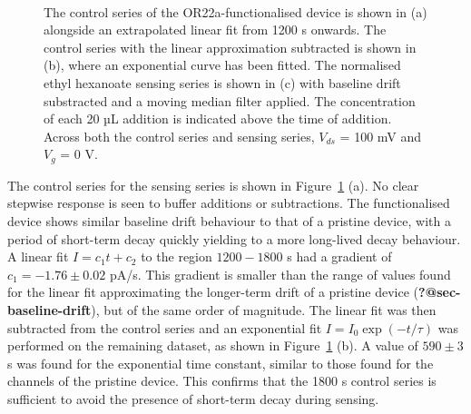 \documentclass[
  a4paper,
]{scrbook}
\begin{document}
\begin{figure}
\begin{minipage}[t]{0.70\linewidth}
{{}

}

\end{minipage}%
%
\begin{minipage}[t]{0.15\linewidth}

{\centering 

~

}

\end{minipage}%

\caption{\label{fig-OR22a-series}The control series of the
OR22a-functionalised device is shown in (a) alongside an extrapolated
linear fit from 1200 s onwards. The control series with the linear
approximation subtracted is shown in (b), where an exponential curve has
been fitted. The normalised ethyl hexanoate sensing series is shown in
(c) with baseline drift substracted and a moving median filter applied.
The concentration of each 20 µL addition is indicated above the time of
addition. Across both the control series and sensing series, \(V_{ds}\)
= 100 mV and \(V_g\) = 0 V.}

\end{figure}

The control series for the sensing series is shown in
Figure~\ref{fig-OR22a-series} (a). No clear stepwise response is seen to
buffer additions or subtractions. The functionalised device shows
similar baseline drift behaviour to that of a pristine device, with a
period of short-term decay quickly yielding to a more long-lived decay
behaviour. A linear fit \(I = c_1t + c_2\) to the region \(1200-1800\) s
had a gradient of \(c_1 = -1.76\pm0.02\) pA/s. This gradient is smaller
than the range of values found for the linear fit approximating the
longer-term drift of a pristine device (\textbf{?@sec-baseline-drift}),
but of the same order of magnitude. The linear fit was then subtracted
from the control series and an exponential fit \(I = I_0\exp(-t/\tau)\)
was performed on the remaining dataset, as shown in
Figure~\ref{fig-OR22a-series} (b). A value of \(590 \pm 3\) s was found
for the exponential time constant, similar to those found for the
channels of the pristine device. This confirms that the 1800 s control
series is sufficient to avoid the presence of short-term decay during
sensing.
\end{document}
